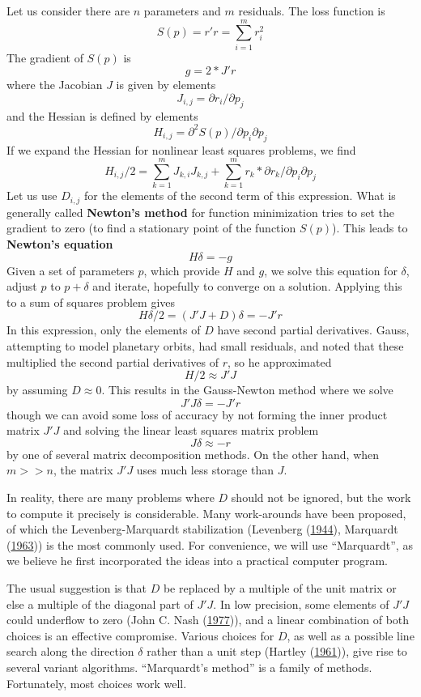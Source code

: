 \documentclass[
]{article}
\begin{document}
Let us consider there are \(n\) parameters and \(m\) residuals. The loss
function is \[ S(p) = r' r = \sum_{i=1}^m { r_i^2 }\] The gradient of
\(S(p)\) is \[ g = 2 * J' r\] where the Jacobian \(J\) is given by
elements \[ J_{i,j} = \partial r_i / \partial p_j \] and the Hessian is
defined by elements
\[ H_{i,j} = \partial ^2 S(p) / {\partial p_i \partial p_j} \] If we
expand the Hessian for nonlinear least squares problems, we find
\[  H_{i,j}/2 = \sum_{k = 1}^m{ J_{k,i} J_{k,j}}  + \sum_{k = 1}^m {r_k * \partial{r_k}/{\partial p_i \partial p_j}}\]
Let us use \(D_{i,j}\) for the elements of the second term of this
expression. What is generally called \textbf{Newton's method} for
function minimization tries to set the gradient to zero (to find a
stationary point of the function \(S(p)\)). This leads to
\textbf{Newton's equation} \[ H \delta  = -g \] Given a set of
parameters \(p\), which provide \(H\) and \(g\), we solve this equation
for \(\delta\), adjust \(p\) to \(p + \delta\) and iterate, hopefully to
converge on a solution. Applying this to a sum of squares problem gives
\[ H \delta / 2 = (J'J + D) \delta = - J' r\] In this expression, only
the elements of \(D\) have second partial derivatives. Gauss, attempting
to model planetary orbits, had small residuals, and noted that these
multiplied the second partial derivatives of \(r\), so he approximated
\[ H / 2 \approx J' J\] by assuming \(D \approx 0\). This results in the
Gauss-Newton method where we solve \[ J' J \delta = - J' r\] though we
can avoid some loss of accuracy by not forming the inner product matrix
\(J' J\) and solving the linear least squares matrix problem
\[ J \delta \approx -r \] by one of several matrix decomposition
methods. On the other hand, when \(m >> n\), the matrix \(J' J\) uses
much less storage than \(J\).

In reality, there are many problems where \(D\) should not be ignored,
but the work to compute it precisely is considerable. Many work-arounds
have been proposed, of which the Levenberg-Marquardt stabilization
(Levenberg (\protect\hyperlink{ref-Levenberg1944}{1944}), Marquardt
(\protect\hyperlink{ref-Marquardt1963}{1963})) is the most commonly
used. For convenience, we will use ``Marquardt'', as we believe he first
incorporated the ideas into a practical computer program.

The usual suggestion is that \(D\) be replaced by a multiple of the unit
matrix or else a multiple of the diagonal part of \(J' J\). In low
precision, some elements of \(J' J\) could underflow to zero (John C.
Nash (\protect\hyperlink{ref-jn77ima}{1977})), and a linear combination
of both choices is an effective compromise. Various choices for \(D\),
as well as a possible line search along the direction \(\delta\) rather
than a unit step (Hartley (\protect\hyperlink{ref-Hartley1961}{1961})),
give rise to several variant algorithms. ``Marquardt's method'' is a
family of methods. Fortunately, most choices work well.
\end{document}
